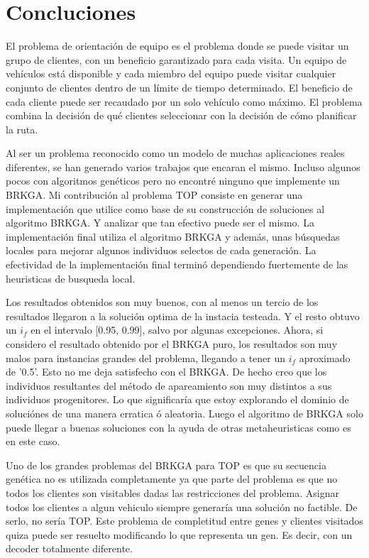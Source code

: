 \chapter{Concluciones}

El problema de orientación de equipo es el problema donde se puede visitar un grupo de clientes, con un beneficio garantizado para cada visita. Un equipo de vehículos está disponible y cada miembro del equipo puede visitar cualquier conjunto de clientes dentro de un límite de tiempo determinado. El beneficio de cada cliente puede ser recaudado por un solo vehículo como máximo. El problema combina la decisión de qué clientes seleccionar con la decisión de cómo planificar la ruta.

\bigskip

Al ser un problema reconocido como un modelo de muchas aplicaciones reales diferentes, se han generado varios trabajos que encaran el mismo. Incluso algunos pocos con algoritmos genéticos pero no encontré ninguno que implemente un BRKGA. Mi contribución al problema TOP consiste en generar una implementación que utilice como base de su construcción de soluciones al algoritmo BRKGA. Y analizar que tan efectivo puede ser el mismo. La implementación final utiliza el algoritmo BRKGA y además, unas búsquedas locales para mejorar algunos individuos selectos de cada generación. La efectividad de la implementación final terminó dependiendo fuertemente de las heuristicas de busqueda local.

\bigskip

Los resultados obtenidos son muy buenos, con al menos un tercio de los resultados llegaron a la solución optima de la instacia testeada. Y el resto obtuvo un $i_f$ en el intervalo [0.95, 0.99], salvo por algunas excepciones. Ahora, si considero el resultado obtenido por el BRKGA puro, los resultados son muy malos para instancias grandes del problema, llegando a tener un $i_f$ aproximado de '0.5'. Esto no me deja satisfecho con el BRKGA. De hecho creo que los individuos resultantes del método de apareamiento son muy distintos a sus individuos progenitores. Lo que significaría que estoy explorando el dominio de soluciónes de una manera erratica ó aleatoria. Luego el algoritmo de BRKGA solo puede llegar a buenas soluciones con la ayuda de otras metaheuristicas como es en este caso.

\bigskip

Uno de los grandes problemas del BRKGA para TOP es que su secuencia genética no es utilizada completamente ya que parte del problema es que no todos los clientes son visitables dadas las restricciones del problema. Asignar todos los clientes a algun vehiculo siempre generaría una solución no factible. De serlo, no sería TOP. Este problema de completitud entre genes y clientes visitados quiza puede ser resuelto modificando lo que representa un gen. Es decir, con un decoder totalmente diferente.

